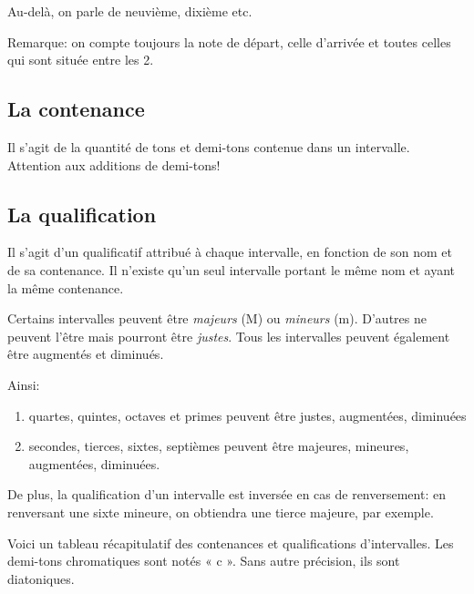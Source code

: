 \documentclass[11pt]{scrreprt}
\begin{document}
Au-delà, on parle de neuvième, dixième etc.

Remarque: on compte toujours la note de départ, celle d'arrivée et toutes celles qui sont située entre les 2.
\subsection{La contenance}
Il s'agit de la quantité de tons et demi-tons contenue dans un intervalle. Attention aux additions de demi-tons!

\subsection{La qualification}
Il s'agit d'un qualificatif attribué à chaque intervalle, en fonction de son nom et de sa contenance. Il n'existe qu'un seul intervalle portant le même nom et ayant la même contenance.

Certains intervalles peuvent être \emph{majeurs} (M) ou \emph{mineurs} (m). D'autres ne peuvent l'être mais pourront être \emph{justes}. Tous les intervalles peuvent également être augmentés et diminués.

Ainsi:
\begin{enumerate}
\item quartes, quintes, octaves et primes peuvent être justes, augmentées, diminuées
\item secondes, tierces, sixtes, septièmes peuvent être majeures, mineures, augmentées, diminuées.
\end{enumerate}

De plus, la qualification d'un intervalle est inversée en cas de renversement: en renversant une sixte mineure, on obtiendra une tierce majeure, par exemple.

Voici un tableau récapitulatif des contenances et qualifications d'intervalles. Les demi-tons chromatiques sont notés « c ». Sans autre précision, ils sont diatoniques.
\end{document}
